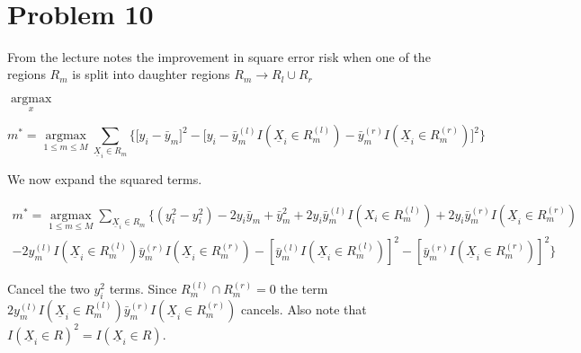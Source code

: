 \documentclass[11pt]{article}
\begin{document}
\begin{center}

\ \\
\end{center}
\section*{Problem 10}
\setlength{\parindent}{0pt}

From the lecture notes the improvement in square error risk when one of the regions $R_m$ is split into daughter regions $R_m \to R_l \cup R_r$

$\underset{x}{\operatorname{argmax}}$

\begin{equation}
m^* = \underset{1 \leq m \leq M}{\operatorname{argmax}} \sum_{\underline{X}_i \in R_m} \Bigg\{\Big[y_i-\bar{y}_m\Big]^2-\Big[y_i - \bar{y}_m^{(l)}I(\underline{X}_i \in R_m^{(l)})-\bar{y}_m^{(r)}I(\underline{X}_i \in R_m^{(r)})\Big]^2\Bigg\}
\end{equation}

We now expand the squared terms. 

\begin{equation}
\begin{split}
m^* = \underset{1 \leq m \leq M}{\operatorname{argmax}} \sum_{\underline{X}_i \in R_m} \Bigg\{(y_i^2-y_i^2) -2y_i\bar{y}_m + \bar{y}_m^2 +2y_i\bar{y}_m^{(l)}I(X_i \in R_m^{(l)}) +2y_i\bar{y}_m^{(r)}I(\underline{X}_i \in R_m^{(r)}) \\- 2y_m^{(l)}I(\underline{X}_i \in R_m^{(l)})\bar{y}_m^{(r)}I(\underline{X}_i \in R_m^{(r)})-[\bar{y}_m^{(l)}I(\underline{X}_i \in R_m^{(l)})]^2-[\bar{y}_m^{(r)}I(\underline{X}_i \in R_m^{(r)})]^2\Bigg\}
\end{split}
\end{equation}

Cancel the two $y_i^2$ terms. Since $R_m^{(l)} \cap R_m^{(r)} = 0$ the term  $2y_m^{(l)}I(\underline{X}_i \in R_m^{(l)})\bar{y}_m^{(r)}I(\underline{X}_i \in R_m^{(r)})$ cancels. Also note that $I(\underline{X}_i \in R)^2 = I(\underline{X}_i \in R)$.
\end{document}
